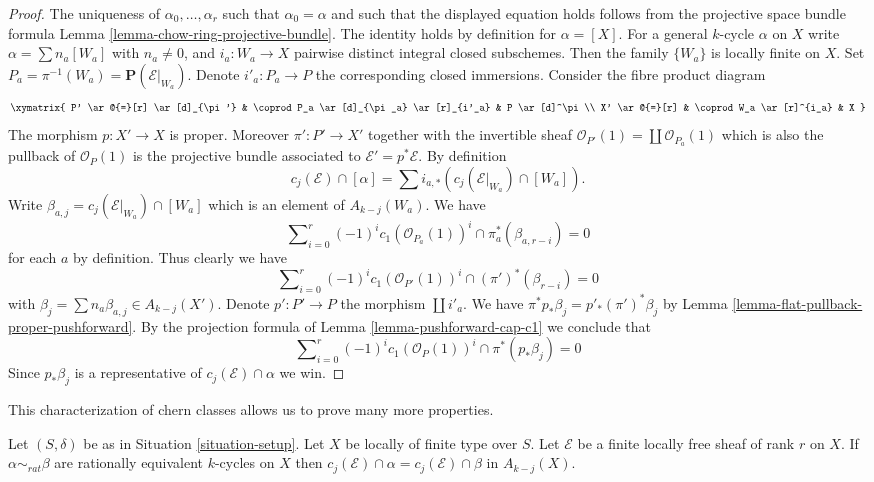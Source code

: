 \begin{proof}
The uniqueness of $\alpha_0, \ldots, \alpha_r$ such that
$\alpha_0 = \alpha$ and such that
the displayed equation holds follows from
the projective space bundle formula
Lemma \ref{lemma-chow-ring-projective-bundle}.
The identity holds by definition for $\alpha = [X]$.
For a general $k$-cycle $\alpha$ on $X$ write
$\alpha = \sum n_a[W_a]$ with $n_a \not = 0$, and
$i_a : W_a \to X$ pairwise distinct integral closed subschemes.
Then the family $\{W_a\}$ is locally finite on $X$.
Set $P_a = \pi^{-1}(W_a) = \mathbf{P}(\mathcal{E}|_{W_a})$.
Denote $i'_a : P_a \to P$ the corresponding closed immersions.
Consider the fibre product diagram
$$
\xymatrix{
P' \ar@{=}[r] \ar[d]_{\pi'} &
\coprod P_a \ar[d]_{\pi_a} \ar[r]_{i'_a} &
P \ar[d]^\pi \\
X' \ar@{=}[r] &
\coprod W_a \ar[r]^{i_a} &
X
}
$$
The morphism $p : X' \to X$ is proper. Moreover
$\pi' : P' \to X'$ together with the invertible sheaf
$\mathcal{O}_{P'}(1) = \coprod \mathcal{O}_{P_a}(1)$
which is also the pullback of $\mathcal{O}_P(1)$
is the projective bundle associated to
$\mathcal{E}' = p^*\mathcal{E}$. By definition
$$
c_j(\mathcal{E}) \cap [\alpha]
=
\sum i_{a, *}(c_j(\mathcal{E}|_{W_a}) \cap [W_a]).
$$
Write $\beta_{a, j} = c_j(\mathcal{E}|_{W_a}) \cap [W_a]$
which is an element of $A_{k - j}(W_a)$. We have
$$
\sum\nolimits_{i = 0}^r
(-1)^i c_1(\mathcal{O}_{P_a}(1))^i \cap \pi_a^*(\beta_{a, r - i}) = 0
$$
for each $a$ by definition. Thus clearly we have
$$
\sum\nolimits_{i = 0}^r
(-1)^i c_1(\mathcal{O}_{P'}(1))^i \cap (\pi')^*(\beta_{r - i}) = 0
$$
with $\beta_j = \sum n_a\beta_{a, j} \in A_{k - j}(X')$. Denote
$p' : P' \to P$ the morphism $\coprod i'_a$.
We have $\pi^*p_*\beta_j = p'_*(\pi')^*\beta_j$
by Lemma \ref{lemma-flat-pullback-proper-pushforward}.
By the projection formula of Lemma \ref{lemma-pushforward-cap-c1}
we conclude that
$$
\sum\nolimits_{i = 0}^r
(-1)^i c_1(\mathcal{O}_P(1))^i \cap \pi^*(p_*\beta_j) = 0
$$
Since $p_*\beta_j$ is a representative of $c_j(\mathcal{E}) \cap \alpha$
we win.
\end{proof}

\noindent
This characterization of chern classes allows us to prove many more
properties.

\begin{lemma}
\label{lemma-cap-chern-class-factors-rational-equivalence}
Let $(S, \delta)$ be as in Situation \ref{situation-setup}.
Let $X$ be locally of finite type over $S$.
Let $\mathcal{E}$ be a finite locally free sheaf of rank $r$ on $X$.
If $\alpha \sim_{rat} \beta$ are rationally equivalent $k$-cycles
on $X$ then $c_j(\mathcal{E}) \cap \alpha = c_j(\mathcal{E}) \cap \beta$
in $A_{k - j}(X)$.
\end{lemma}

